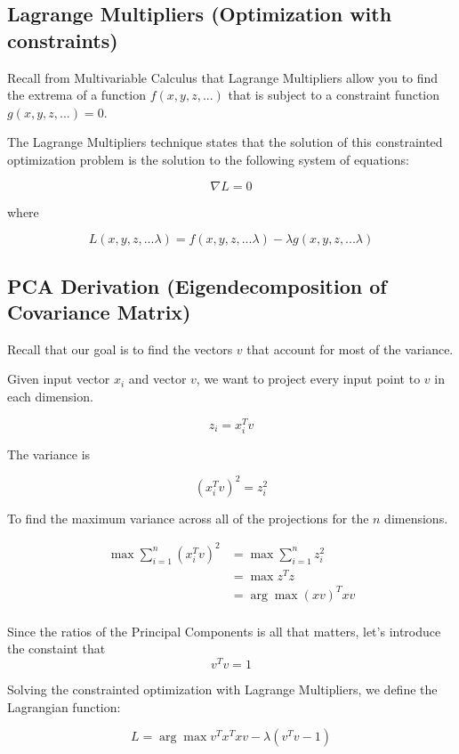 \documentclass[openany]{book}
\begin{document}
    \subsection{Lagrange Multipliers (Optimization with
constraints)}\label{lagrange-multipliers-optimization-with-constraints}

Recall from Multivariable Calculus that Lagrange Multipliers allow you
to find the extrema of a function \(f(x, y, z, ...)\) that is subject to
a constraint function \(g(x, y, z, ...)=0\).

The Lagrange Multipliers technique states that the solution of this
constrainted optimization problem is the solution to the following
system of equations:

\[\nabla L = 0\]

where

\[L(x, y, z, ... \lambda) = f(x, y, z, ... \lambda) - \lambda g(x, y, z, ... \lambda)\]

    \subsection{PCA Derivation (Eigendecomposition of Covariance
Matrix)}\label{pca-derivation-eigendecomposition-of-covariance-matrix}

Recall that our goal is to find the vectors \(v\) that account for most
of the variance.

Given input vector \(x_i\) and vector \(v\), we want to project every
input point to \(v\) in each dimension.

\[z_i = x_i^Tv\]

The variance is

\[(x_i^Tv)^2 = z_i^2\]

To find the maximum variance across all of the projections for the \(n\)
dimensions.

\begin{align*}
\max \sum_{i=1}^{n} (x_i^Tv)^2 &= \max \sum_{i=1}^{n} z_i^2 \\ 
&= \max z^Tz \\ 
&= \arg\max (xv)^Txv \\ 
\end{align*}

Since the ratios of the Principal Components is all that matters, let's
introduce the constaint that \[v^Tv = 1\]

    Solving the constrainted optimization with Lagrange Multipliers, we
define the Lagrangian function:

\[ L = \arg\max v^Tx^Txv - \lambda (v^Tv - 1)\]
\end{document}
